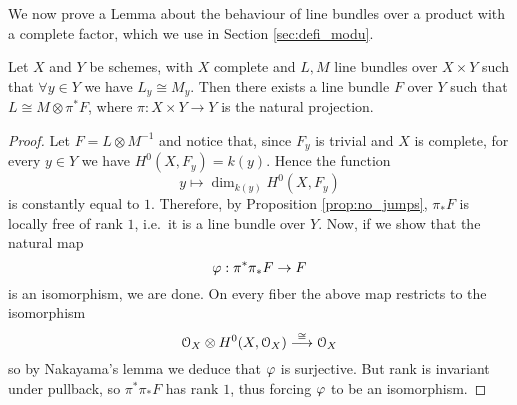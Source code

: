 	\begin{comment}
		\begin{lemm}\label{lemm:tensor_ampleness}
			Let $X$ be a proper Noetherian variety and $L_1, \dots, L_m$ a finite number of ample line bundles over $X$. Then their tensor product $ \otimes_{i=1}^m L_i $ is ample.
		\end{lemm}
		\begin{proof}
			We will prove the claim for a pair of line bundles $L$ and $M$, then the general result easily follows by induction over $m$.\\

			Since $X$ is proper and Noetherian the Cartan-Serre-Grothendieck Theorem holds and, thus, an equivalent condition for the ampleness of $L$ is the existence of a natural number $m\in \N$ such that for every coherent sheaf $\scr{F}$ on $X$ we have
			$$ H^i(X, \scr{F}\otimes L^{\otimes n}) = 0 \qquad \forall \; i\geq 1 \,. $$
		 	Now let $\scr{E}$ be any coherent sheaf on $X$ and notice that, in particular, the above condition holds for the coherent $\scr{F} = \scr{E}\otimes M^{\otimes n}$. Therefore for every $i\geq 1$ we find
		 	$$ H^i(X, \scr{E}\otimes (L\otimes M)^{\otimes n} ) = H^i(X, \scr{F}\otimes L^{\otimes n} ) = 0 $$
		 	and, hence, by another application of the Cartan-Serre-Grothendieck Theorem we see that $L\otimes M$ is ample.
		\end{proof}	
	\end{comment}	

	We now prove a Lemma about the behaviour of line bundles over a product with a complete factor, which we use in Section \ref{sec:defi_modu}.
	\begin{lemm}\label{lemm:square}
		Let $X$ and $Y$ be schemes, with $X$ complete and $L,M$ line bundles over $X\times Y$ such that $\forall y\in Y$ we have $L_y \cong M_y$. Then there exists a line bundle $F$ over $Y$ such that $L\cong M\otimes \pi^* F$, where $\pi :X \times Y\to Y$ is the natural projection.
	\end{lemm}
	\begin{proof}
		Let $F=L\otimes M^{-1}$ and notice that, since $F_y$ is trivial and $X$ is complete, for every $y\in Y$ we have $H^0(X, F_y)=k(y)$. Hence the function
		$$ y \mapsto \dim_{k(y)} H^0(X, F_y) $$
		is constantly equal to $1$. Therefore, by Proposition \ref{prop:no_jumps}, $\pi_* F$ is locally free of rank $1$, i.e.\ it is a line bundle over $Y$. Now, if we show that the natural map 
		$$ \varphi: \pi^*\pi_* F \to F $$
		is an isomorphism, we are done. On every fiber the above map restricts to the isomorphism
		$$ \mathcal{O}_X \otimes H^0(X, \mathcal{O}_X) \overset{\cong}\longrightarrow \mathcal{O}_X $$
		so by Nakayama's lemma we deduce that $\varphi$ is surjective. But rank is invariant under pullback, so $\pi^* \pi_* F$ has rank $1$, thus forcing $\varphi$ to be an isomorphism.
	\end{proof}

